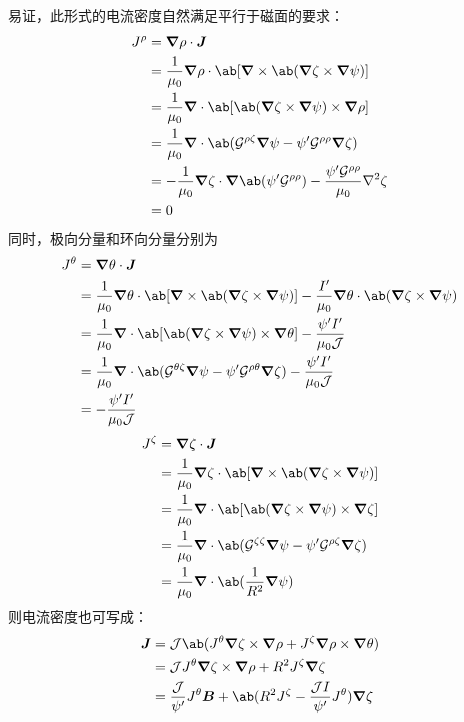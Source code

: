 易证，此形式的电流密度自然满足平行于磁面的要求：
\begin{equation}\begin{aligned}
J^\rho &= \grad{\rho} \cdot \vec{J} \\
&= \frac{1}{\mu_0} \grad{\rho} \cdot \ab[\curl{\ab(\grad{\zeta} \times \grad{\psi})}] \\
&= \frac{1}{\mu_0} \dive{\ab[
    \ab(\grad{\zeta} \times \grad{\psi}) \times \grad{\rho}
]} \\
&= \frac{1}{\mu_0} \dive{\ab(
    \Metric^{\rho\zeta} \grad{\psi}
    - \psi' \Metric^{\rho\rho} \grad{\zeta}
)} \\
&= - \frac{1}{\mu_0} \grad{\zeta} \cdot \grad{\ab(
    \psi' \Metric^{\rho\rho}
)}
- \frac{\psi' \Metric^{\rho\rho}}{\mu_0} \laplacian{\zeta} \\
&= 0
\end{aligned}\end{equation}
同时，极向分量和环向分量分别为
\begin{equation}\begin{aligned}
J^\theta &= \grad{\theta} \cdot \vec{J} \\
&= \frac{1}{\mu_0} \grad{\theta} \cdot \ab[
    \curl{\ab(\grad{\zeta} \times \grad{\psi})}
]
- \frac{I'}{\mu_0} \grad{\theta} \cdot \ab(\grad{\zeta} \times \grad{\psi}) \\
&= \frac{1}{\mu_0} \dive{\ab[
    \ab(\grad{\zeta} \times \grad{\psi}) \times \grad{\theta}
]} - \frac{\psi' I'}{\mu_0 \Jacobian} \\
&= \frac{1}{\mu_0} \dive{\ab(
    \Metric^{\theta\zeta} \grad{\psi}
    - \psi' \Metric^{\rho\theta} \grad{\zeta}
)} - \frac{\psi' I'}{\mu_0 \Jacobian} \\
&=  - \frac{\psi' I'}{\mu_0 \Jacobian}
\end{aligned}\end{equation}
\begin{equation}\begin{aligned}
J^\zeta &= \grad{\zeta} \cdot \vec{J} \\
&= \frac{1}{\mu_0} \grad{\zeta}
\cdot \ab[\curl{\ab(\grad{\zeta} \times \grad{\psi})}] \\
&= \frac{1}{\mu_0} \dive{\ab[
    \ab(\grad{\zeta} \times \grad{\psi}) \times \grad{\zeta}
]} \\
&= \frac{1}{\mu_0} \dive{\ab(
    \Metric^{\zeta\zeta} \grad{\psi}
    - \psi' \Metric^{\rho\zeta} \grad{\zeta}
)} \\
&= \frac{1}{\mu_0} \dive{\ab(
    \frac{1}{R^2} \grad{\psi}
)}
\end{aligned}\end{equation}
则电流密度也可写成：
\begin{equation}\begin{aligned}
\vec{J} &= \Jacobian \ab(
    J^\theta \grad{\zeta} \times \grad{\rho}
    + J^\zeta \grad{\rho} \times \grad{\theta}
) \\
&= \Jacobian J^\theta \grad{\zeta} \times \grad{\rho}
+ R^2 J^\zeta \grad{\zeta} \\
&= \frac{\Jacobian}{\psi'} J^\theta \vec{B}
+ \ab(R^2 J^\zeta - \frac{\Jacobian I}{\psi'} J^\theta) \grad{\zeta}
\end{aligned}\end{equation}

